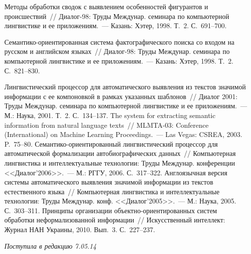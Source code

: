 \begin{multicols}{2}
{{\begin{thebibliography}{99}
 Методы обработки сводок с выявлением особенностей фигурантов и
происшествий~// Диалог-98: Труды Междунар. семинара по
компьютерной лингвистике и ее приложениям.~--- Казань: Хэтер, 1998.  Т.~2.
С.~691--700.

Се\-ман\-ти\-ко-ори\-ен\-ти\-ро\-ван\-ная сис\-те\-ма фактографического поиска со
входом на русском и английском языках~// Диалог-98: Труды Междунар.
семинара по компьютерной лингвистике и ее приложениям.~--- Казань:
Хэтер, 1998.  Т.~2. С.~821--830.

Лингвистический процессор для автоматического выявления из текстов
значимой информации с ее компоновкой в рамках указанных шаблонов~//
Диалог 2001: Труды Междунар. семинара по компьютерной лингвистике
и ее приложениям.~--- М.: Наука, 2001.  Т.~2. С.~134--137.
The system for extracting semantic information from natural language texts~//
MLMTA-03:  Conference (International) on Machine Learning Proceedings.~---
Las Vegas: CSREA, 2003. P.~75--80.
Се\-ман\-ти\-ко-ори\-ен\-тированный лингвистический процессор для
авто\-матической формализации автобиографических \mbox{данных}~// Компьютерная
лингвистика и интеллектуальные технологии: Труды Междунар.
конференции <<Диалог'2006>>.~--- М.: РГГУ, 2006. С.~317--322.
Англоязычная версия системы автоматического выявления значимой
информации из текстов естественного языка~// Компьютерная лингвистика и
интеллектуальные технологии: Труды Междунар. конф.
<<Диалог'2005>>.~--- М.: Наука, 2005. С.~303--311.
Принципы организации объ\-ект\-но-ори\-ен\-ти\-ро\-ван\-ных сис\-тем
обработки неформализованной информации~// Искусственный интеллект:
Журнал НАН Украины, 2010. Вып.~3. С.~227--237.

\end{thebibliography}

 }
 }

 \end{multicols}

 \vspace*{-6pt}

 \hfill{\small\textit{Поступила в редакцию 7.05.14}}

 \newpage

